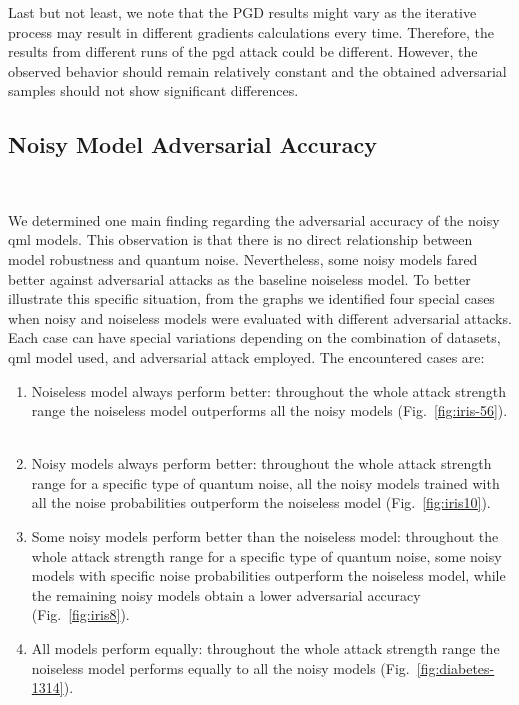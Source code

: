 \pagebreak

Last but not least, we note that the PGD results might
vary as the iterative process may result in different
gradients calculations every time. Therefore, the
results from different runs of the \ac{pgd} attack
could be different. However, the observed behavior
should remain relatively constant and the obtained
adversarial samples should not show significant
differences. \

\subsection{Noisy Model Adversarial Accuracy}\label{subsection:noisy_adv_acc} \

We determined one main finding regarding the adversarial accuracy
of the noisy \ac{qml} models. This observation is that there is no
direct relationship between model robustness and quantum noise.
Nevertheless, some noisy models fared better against adversarial
attacks as the baseline noiseless model. To better illustrate this
specific situation, from the graphs we identified four special
cases when noisy and noiseless models were evaluated with
different adversarial attacks. Each case can have special
variations depending on the combination of datasets,
\ac{qml} model used, and adversarial attack employed.
The encountered cases are: \

\begin{enumerate}
  \item Noiseless model always perform better: throughout the whole attack
        strength range the noiseless model outperforms all the noisy models
        (Fig.~\ref{fig:iris-56}). \
  \item Noisy models always perform better: throughout the whole attack
        strength range for a specific type of quantum noise, all the noisy
        models trained with all the noise probabilities outperform the
        noiseless model (Fig.~\ref{fig:iris10}). \
  \item Some noisy models perform better than the noiseless model: throughout
        the whole attack strength range for a specific type of quantum noise,
        some noisy models with specific noise probabilities outperform the
        noiseless model, while the remaining noisy models obtain a lower
        adversarial accuracy (Fig.~\ref{fig:iris8}). \
  \item All models perform equally: throughout the whole attack strength
        range the noiseless model performs equally to all the noisy models
        (Fig.~\ref{fig:diabetes-1314}). \
\end{enumerate}

